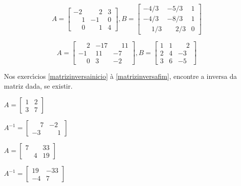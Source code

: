 \documentclass[12pt]{exam}
\begin{document}
\begin{exercicio}
  \[
    A =\begin{bmatrix}
      -2 & \phantom{-} 2 & 3\\
      \phantom{-} 1 & -1 & 0\\
      \phantom{-} 0 & \phantom{-} 1 & 4
    \end{bmatrix}, B =\begin{bmatrix}
      -4/3 & -5/3 & 1\\
      -4/3 & -8/3 & 1\\
      \phantom{-} 1/3 & \phantom{-} 2/3 & 0
    \end{bmatrix}
  \]
\end{exercicio}

\begin{exercicio}\label{matrizfim}
  \[
    A =\begin{bmatrix}
      \phantom{-} 2 & -17 & \phantom{-} 11\\
      -1 & 11 & -7\\
      \phantom{-} 0 & 3 & -2
    \end{bmatrix}, B =\begin{bmatrix}
      1 & 1 & \phantom{-} 2\\
      2 & 4 & -3\\
      3 & 6 & -5
    \end{bmatrix}
  \]
\end{exercicio}

Nos exerc{\'\i}cios \ref{matrizinversainicio} \`a \ref{matrizinversafim}, encontre a inversa da matriz dada, se existir.

\begin{exercicio}\label{matrizinversainicio}
  $
    A =\begin{bmatrix}
        1 & 2\\
        3 & 7
    \end{bmatrix}
  $
  \begin{solucao}
    $A^{-1} =\begin{bmatrix}
      \phantom{-} 7 & -2\\
      -3 & \phantom{-} 1
    \end{bmatrix}$
  \end{solucao}
\end{exercicio}

\begin{exercicio}
  $
    A =\begin{bmatrix}
        7 & 33\\
        \phantom{-} 4 & 19
    \end{bmatrix}
  $
  \begin{solucao}
    $A^{-1} =\begin{bmatrix}
      19 & -33\\
      -4 & 7
    \end{bmatrix}$
  \end{solucao}
\end{exercicio}
\end{document}
